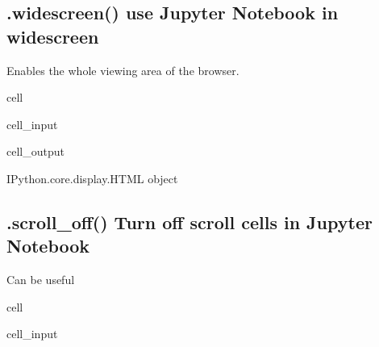 \documentclass[letterpaper,10pt,english]{jupyterBook}
\begin{document}
\subsection{.widescreen() use Jupyter Notebook in widescreen}
\label{\detokenize{content/notebooks/modelflow_features:widescreen-use-jupyter-notebook-in-widescreen}}
\sphinxAtStartPar
Enables the whole viewing area of the browser.

\begin{sphinxuseclass}{cell}\begin{sphinxVerbatimInput}

\begin{sphinxuseclass}{cell_input}
\begin{sphinxVerbatim}[commandchars=\\\{\}]
\end{sphinxVerbatim}

\end{sphinxuseclass}\end{sphinxVerbatimInput}
\begin{sphinxVerbatimOutput}

\begin{sphinxuseclass}{cell_output}
\begin{sphinxVerbatim}[commandchars=\\\{\}]
\PYGZlt{}IPython.core.display.HTML object\PYGZgt{}
\end{sphinxVerbatim}

\end{sphinxuseclass}\end{sphinxVerbatimOutput}

\end{sphinxuseclass}

\subsection{.scroll\_off() Turn off scroll cells in Jupyter Notebook}
\label{\detokenize{content/notebooks/modelflow_features:scroll-off-turn-off-scroll-cells-in-jupyter-notebook}}
\sphinxAtStartPar
Can be useful

\begin{sphinxuseclass}{cell}\begin{sphinxVerbatimInput}

\begin{sphinxuseclass}{cell_input}
\begin{sphinxVerbatim}[commandchars=\\\{\}]
\end{sphinxVerbatim}

\end{sphinxuseclass}\end{sphinxVerbatimInput}

\end{sphinxuseclass}
\end{document}
